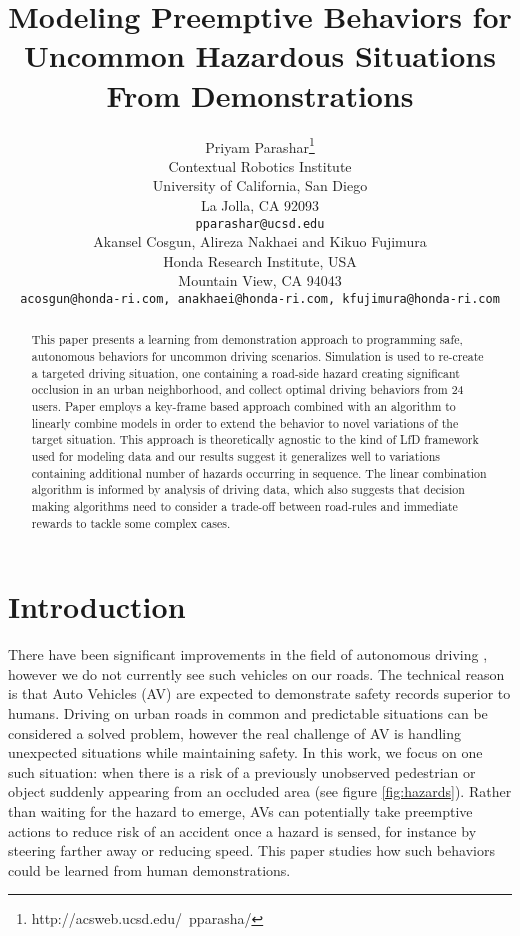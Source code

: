\documentclass{article}
\title{Modeling Preemptive Behaviors for Uncommon Hazardous Situations From Demonstrations}
\author{
  Priyam Parashar\thanks{http://acsweb.ucsd.edu/~pparasha/} \\
  Contextual Robotics Institute\\
  University of California, San Diego\\
  La Jolla, CA 92093 \\
  \texttt{pparashar@ucsd.edu} \\
  \And
  Akansel Cosgun, Alireza Nakhaei and Kikuo Fujimura\\
  Honda Research Institute, USA \\
  Mountain View, CA 94043\\
  \texttt{acosgun@honda-ri.com, anakhaei@honda-ri.com, kfujimura@honda-ri.com} \\
}
\begin{document}

\maketitle

\begin{abstract}
This paper presents a learning from demonstration approach to programming safe, autonomous 
behaviors for uncommon driving scenarios. Simulation is used to re-create a targeted driving 
situation, one containing a road-side hazard creating significant occlusion in an 
urban neighborhood, and collect optimal driving behaviors from 24 users.
Paper employs a key-frame based approach combined with an algorithm to linearly combine models 
in order to extend the behavior to novel variations of the target situation.
This approach is theoretically agnostic to the kind of LfD framework used for modeling data
and our results suggest it generalizes well to variations containing additional 
number of hazards occurring in sequence. The linear combination algorithm is informed by 
analysis of driving data, which also suggests that decision making algorithms need to
consider a trade-off between road-rules and immediate rewards to tackle some complex cases.
\end{abstract}

\section{Introduction}

There have been significant improvements in the field of autonomous driving 
\cite{bojarski2016end,chen2015deepdriving,zhang2016learning,sadigh2016planning,wei2013towards,ross2011reduction}, however we do not currently see such vehicles on our 
roads. The technical reason is that Auto Vehicles (AV) are expected to demonstrate 
safety records superior to humans. Driving on urban roads in 
common and predictable situations can  be considered a solved problem, 
however the real challenge of AV is handling unexpected situations while 
maintaining safety\cite{mitsch2013provably}.
In this work, we focus on one such situation: when there is a risk of a previously 
unobserved  pedestrian or object suddenly appearing from an occluded area (see figure 
\ref{fig:hazards}). Rather than waiting for the hazard to emerge, AVs can potentially 
take preemptive actions to reduce risk of an accident once a hazard is sensed, 
for instance by steering farther away or reducing speed\cite{mckenna1999hazard}. This paper studies how such
behaviors could be learned from human demonstrations.
\end{document}
